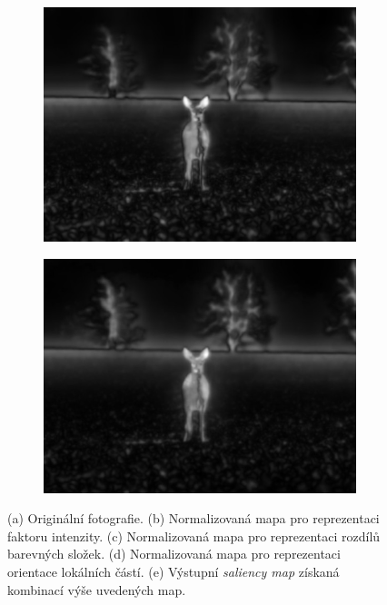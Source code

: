 \begin{figure}[H]
\begin{subfigure}{0.32\textwidth}
      \includegraphics[scale=1.0]{obrazky/ittiOrientation23.jpg}
      \caption{}
    \end{subfigure}
    \vspace{2pt}
    
    \begin{subfigure}{\textwidth}
      \centering
      \includegraphics[scale=1.0]{obrazky/ittiSM23.jpg}
      \caption{}
    \end{subfigure}
\caption{(a) Originální fotografie. (b) Normalizovaná mapa pro reprezentaci faktoru intenzity. (c) Normalizovaná mapa pro reprezentaci rozdílů barevných složek. (d) Normalizovaná mapa pro reprezentaci orientace lokálních částí. (e) Výstupní \emph{saliency map} získaná kombinací výše uvedených map.}
\label{obr:ittiSM}
\end{figure}


